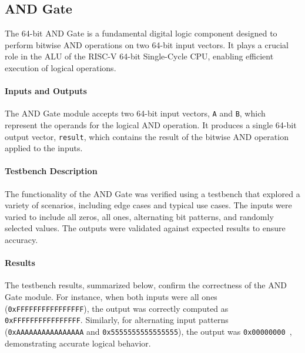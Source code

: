 \documentclass[12pt]{article}
\begin{document}
\newpage

\subsection*{AND Gate}

The 64-bit AND Gate is a fundamental digital logic component designed to perform bitwise AND operations on two 64-bit input vectors. It plays a crucial role in the ALU of the RISC-V 64-bit Single-Cycle CPU, enabling efficient execution of logical operations.

\paragraph{Inputs and Outputs}
The AND Gate module accepts two 64-bit input vectors, \texttt{A} and \texttt{B}, which represent the operands for the logical AND operation. It produces a single 64-bit output vector, \texttt{result}, which contains the result of the bitwise AND operation applied to the inputs.

\paragraph{Testbench Description}
The functionality of the AND Gate was verified using a testbench that explored a variety of scenarios, including edge cases and typical use cases. The inputs were varied to include all zeros, all ones, alternating bit patterns, and randomly selected values. The outputs were validated against expected results to ensure accuracy.

\paragraph{Results}
The testbench results, summarized below, confirm the correctness of the AND Gate module. For instance, when both inputs were all ones (\texttt{0xFFFFFFFFFFFFFFFF}), the output was correctly computed as \texttt{0xFFFFFFFFFFFFFFFF}. Similarly, for alternating input patterns (\texttt{0xAAAAAAAAAAAAAAAA} and \texttt{0x5555555555555555}), the output was \texttt{0x00000000 }, demonstrating accurate logical behavior.
\end{document}
